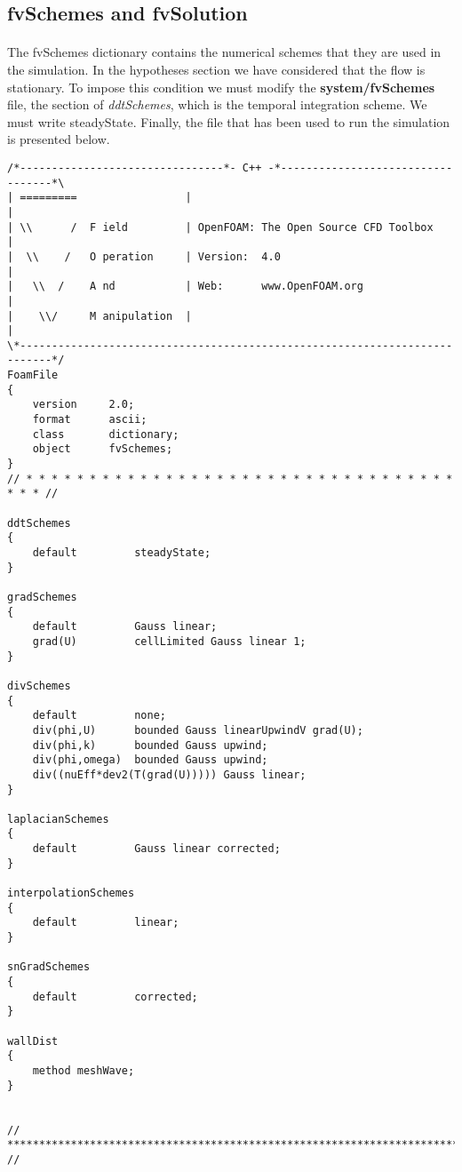 \subsection{fvSchemes and fvSolution}
\paragraph{}
The fvSchemes dictionary contains the numerical schemes that they are used in the simulation. In the hypotheses section we have considered that the flow is stationary. To impose this condition we must modify the \textbf{system/fvSchemes} file, the section of \textit{ ddtSchemes}, which is the temporal integration scheme. We must write steadyState. Finally, the file that has been used to run the simulation is presented below.

\begin{footnotesize}
\begin{verbatim}
/*--------------------------------*- C++ -*----------------------------------*\
| =========                 |                                                 |
| \\      /  F ield         | OpenFOAM: The Open Source CFD Toolbox           |
|  \\    /   O peration     | Version:  4.0                                   |
|   \\  /    A nd           | Web:      www.OpenFOAM.org                      |
|    \\/     M anipulation  |                                                 |
\*---------------------------------------------------------------------------*/
FoamFile
{
    version     2.0;
    format      ascii;
    class       dictionary;
    object      fvSchemes;
}
// * * * * * * * * * * * * * * * * * * * * * * * * * * * * * * * * * * * * * //

ddtSchemes
{
    default         steadyState;
}

gradSchemes
{
    default         Gauss linear;
    grad(U)         cellLimited Gauss linear 1;
}

divSchemes
{
    default         none;
    div(phi,U)      bounded Gauss linearUpwindV grad(U);
    div(phi,k)      bounded Gauss upwind;
    div(phi,omega)  bounded Gauss upwind;
    div((nuEff*dev2(T(grad(U))))) Gauss linear;
}

laplacianSchemes
{
    default         Gauss linear corrected;
}

interpolationSchemes
{
    default         linear;
}

snGradSchemes
{
    default         corrected;
}

wallDist
{
    method meshWave;
}


// ************************************************************************* //

\end{verbatim}
\end{footnotesize}


